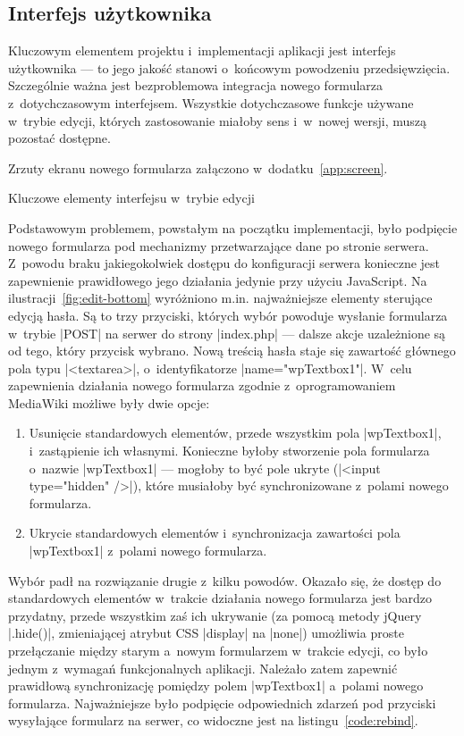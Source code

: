 \subsection{Interfejs użytkownika}
Kluczowym elementem projektu i~implementacji aplikacji jest interfejs użytkownika --- to jego jakość stanowi o~końcowym powodzeniu przedsięwzięcia. Szczególnie ważna jest bezproblemowa integracja nowego formularza z~dotychczasowym interfejsem. Wszystkie dotychczasowe funkcje używane w~trybie edycji, których zastosowanie miałoby sens i~w~nowej wersji, muszą pozostać dostępne.

Zrzuty ekranu nowego formularza załączono w~dodatku~\ref{app:screen}.

\begin{illustration}
	\caption{Kluczowe elementy interfejsu w~trybie edycji}
	\label{fig:edit-bottom}
\end{illustration}

Podstawowym problemem, powstałym na początku implementacji, było podpięcie nowego formularza pod mechanizmy przetwarzające dane po stronie serwera. Z~powodu braku jakiegokolwiek dostępu do konfiguracji serwera konieczne jest zapewnienie prawidłowego jego działania jedynie przy użyciu JavaScript. Na ilustracji~\ref{fig:edit-bottom} wyróżniono m.in. najważniejsze elementy sterujące edycją hasła. Są to trzy przyciski, których wybór powoduje wysłanie formularza w~trybie \kod|POST| na serwer do strony \kod|index.php| --- dalsze akcje uzależnione są od tego, który przycisk wybrano. Nową treścią hasła staje się zawartość głównego pola typu \kod|<textarea>|, o~identyfikatorze \kod|name="wpTextbox1"|. W~celu zapewnienia działania nowego formularza zgodnie z~oprogramowaniem MediaWiki możliwe były dwie opcje:
\begin{enumerate}
\item Usunięcie standardowych elementów, przede wszystkim pola \kod|wpTextbox1|, i~zastąpienie ich własnymi. Konieczne byłoby stworzenie pola formularza o~nazwie \kod|wpTextbox1| --- mogłoby to być pole ukryte (\kod|<input type="hidden" />|), które musiałoby być synchronizowane z~polami nowego formularza.
\item Ukrycie standardowych elementów i~synchronizacja zawartości pola \kod|wpTextbox1| z~polami nowego formularza.
\end{enumerate}
Wybór padł na rozwiązanie drugie z~kilku powodów. Okazało się, że dostęp do standardowych elementów w~trakcie działania nowego formularza jest bardzo przydatny, przede wszystkim zaś ich ukrywanie (za pomocą metody jQuery \kod|.hide()|, zmieniającej atrybut CSS \kod|display| na \kod|none|) umożliwia proste przełączanie między starym a~nowym formularzem w~trakcie edycji, co było jednym z~wymagań funkcjonalnych aplikacji. Należało zatem zapewnić prawidłową synchronizację pomiędzy polem \kod|wpTextbox1| a~polami nowego formularza. Najważniejsze było podpięcie odpowiednich zdarzeń pod przyciski wysyłające formularz na serwer, co widoczne jest na listingu~\ref{code:rebind}.

